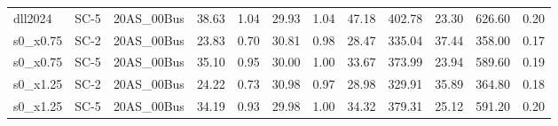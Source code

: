 \begin{table}[htbp]
{\begin{tabular}{lllrrrrrrrrr}
dll2024 & SC-5 & 20AS\_00Bus & 38.63 & 1.04 & 29.93 & 1.04 & 47.18 & 402.78 & 23.30 & 626.60 & 0.20 \\
s0\_x0.75 & SC-2 & 20AS\_00Bus & 23.83 & 0.70 & 30.81 & 0.98 & 28.47 & 335.04 & 37.44 & 358.00 & 0.17 \\
s0\_x0.75 & SC-5 & 20AS\_00Bus & 35.10 & 0.95 & 30.00 & 1.00 & 33.67 & 373.99 & 23.94 & 589.60 & 0.19 \\
s0\_x1.25 & SC-2 & 20AS\_00Bus & 24.22 & 0.73 & 30.98 & 0.97 & 28.98 & 329.91 & 35.89 & 364.80 & 0.18 \\
s0\_x1.25 & SC-5 & 20AS\_00Bus & 34.19 & 0.93 & 29.98 & 1.00 & 34.32 & 379.31 & 25.12 & 591.20 & 0.20 \\
\bottomrule
\end{tabular}}
\end{table}
